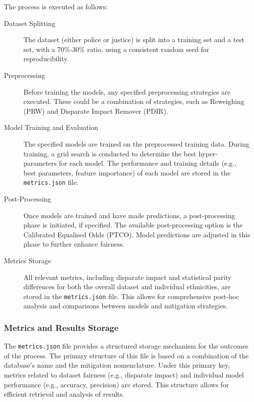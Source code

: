 \documentclass[runningheads]{llncs}
\begin{document}
The process is executed as follows:
\begin{description}
\item[Dataset Splitting] The dataset (either police or justice) is
    split into a training set and a test set, with a 70\%-30\% ratio,
    using a consistent random seed for reproducibility.

\item[Preprocessing] Before training the models, any specified
    preprocessing strategies are executed. These could be a
    combination of strategies, such as Reweighing (PRW) and Disparate
    Impact Remover (PDIR).

\item[Model Training and Evaluation] The specified models are trained
    on the preprocessed training data. During training, a grid search
    is conducted to determine the best hyper-parameters for each
    model. The performance and training details (e.g., best
    parameters, feature importance) of each model are stored in the
    \texttt{metrics.json} file.

\item[Post-Processing] Once models are trained and have made
    predictions, a post-processing phase is initiated, if specified.
    The available post-processing option is the Calibrated Equalised
    Odds (PTCO). Model predictions are adjusted in this phase to
    further enhance fairness.

\item[Metrics Storage] All relevant metrics, including disparate
    impact and statistical parity differences for both the overall
    dataset and individual ethnicities, are stored in the
    \texttt{metrics.json} file. This allows for comprehensive post-hoc
    analysis and comparisons between models and mitigation strategies.
\end{description}

\subsubsection{Metrics and Results Storage}

The \texttt{metrics.json} file provides a structured storage mechanism
for the outcomes of the process. The primary structure of this file is
based on a combination of the database's name and the mitigation
nomenclature. Under this primary key, metrics related to dataset
fairness (e.g., disparate impact) and individual model performance
(e.g., accuracy, precision) are stored. This structure allows for
efficient retrieval and analysis of results.
\end{document}
